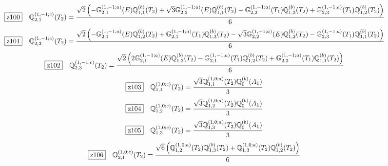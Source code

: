 \documentclass[fleqn,10pt,landscape]{jsarticle}
\begin{document}
\begin{dmath*}
\hspace*{3mm}\fbox{z100}\quad \mathbb{Q}_{2,1}^{(1,-1;c)}(T_{2})=\frac{\sqrt{2} \left(- \mathbb{G}_{2,1}^{(1,-1;a)}(E) \mathbb{Q}_{1,1}^{(b)}(T_{2}) + \sqrt{3} \mathbb{G}_{2,2}^{(1,-1;a)}(E) \mathbb{Q}_{1,1}^{(b)}(T_{2}) - \mathbb{G}_{2,2}^{(1,-1;a)}(T_{1}) \mathbb{Q}_{1,3}^{(b)}(T_{2}) + \mathbb{G}_{2,3}^{(1,-1;a)}(T_{1}) \mathbb{Q}_{1,2}^{(b)}(T_{2})\right)}{6}
\end{dmath*}
\begin{dmath*}
\hspace*{3mm}\fbox{z101}\quad \mathbb{Q}_{2,2}^{(1,-1;c)}(T_{2})=\frac{\sqrt{2} \left(- \mathbb{G}_{2,1}^{(1,-1;a)}(E) \mathbb{Q}_{1,2}^{(b)}(T_{2}) + \mathbb{G}_{2,1}^{(1,-1;a)}(T_{1}) \mathbb{Q}_{1,3}^{(b)}(T_{2}) - \sqrt{3} \mathbb{G}_{2,2}^{(1,-1;a)}(E) \mathbb{Q}_{1,2}^{(b)}(T_{2}) - \mathbb{G}_{2,3}^{(1,-1;a)}(T_{1}) \mathbb{Q}_{1,1}^{(b)}(T_{2})\right)}{6}
\end{dmath*}
\begin{dmath*}
\hspace*{3mm}\fbox{z102}\quad \mathbb{Q}_{2,3}^{(1,-1;c)}(T_{2})=\frac{\sqrt{2} \left(2 \mathbb{G}_{2,1}^{(1,-1;a)}(E) \mathbb{Q}_{1,3}^{(b)}(T_{2}) - \mathbb{G}_{2,1}^{(1,-1;a)}(T_{1}) \mathbb{Q}_{1,2}^{(b)}(T_{2}) + \mathbb{G}_{2,2}^{(1,-1;a)}(T_{1}) \mathbb{Q}_{1,1}^{(b)}(T_{2})\right)}{6}
\end{dmath*}
\begin{dmath*}
\hspace*{3mm}\fbox{z103}\quad \mathbb{Q}_{1,1}^{(1,0;c)}(T_{2})=\frac{\sqrt{3} \mathbb{Q}_{1,1}^{(1,0;a)}(T_{2}) \mathbb{Q}_{0}^{(b)}(A_{1})}{3}
\end{dmath*}
\begin{dmath*}
\hspace*{3mm}\fbox{z104}\quad \mathbb{Q}_{1,2}^{(1,0;c)}(T_{2})=\frac{\sqrt{3} \mathbb{Q}_{1,2}^{(1,0;a)}(T_{2}) \mathbb{Q}_{0}^{(b)}(A_{1})}{3}
\end{dmath*}
\begin{dmath*}
\hspace*{3mm}\fbox{z105}\quad \mathbb{Q}_{1,3}^{(1,0;c)}(T_{2})=\frac{\sqrt{3} \mathbb{Q}_{1,3}^{(1,0;a)}(T_{2}) \mathbb{Q}_{0}^{(b)}(A_{1})}{3}
\end{dmath*}
\begin{dmath*}
\hspace*{3mm}\fbox{z106}\quad \mathbb{Q}_{2,1}^{(1,0;c)}(T_{2})=\frac{\sqrt{6} \left(\mathbb{Q}_{1,2}^{(1,0;a)}(T_{2}) \mathbb{Q}_{1,3}^{(b)}(T_{2}) + \mathbb{Q}_{1,3}^{(1,0;a)}(T_{2}) \mathbb{Q}_{1,2}^{(b)}(T_{2})\right)}{6}
\end{dmath*}
\end{document}
